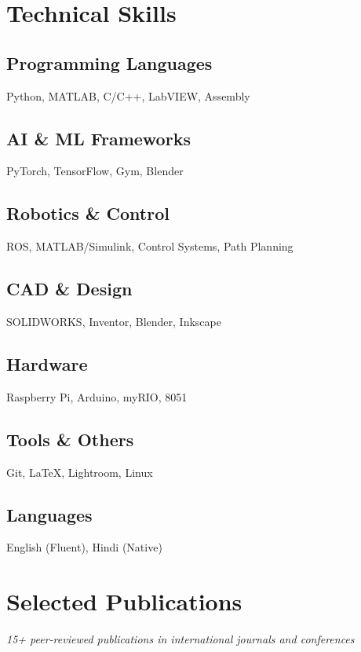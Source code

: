 \documentclass[11pt,a4paper]{article}
\begin{document}
\section*{Technical Skills}

\subsection*{Programming Languages}
Python, MATLAB, C/C++, LabVIEW, Assembly

\subsection*{AI \& ML Frameworks}
PyTorch, TensorFlow, Gym, Blender

\subsection*{Robotics \& Control}
ROS, MATLAB/Simulink, Control Systems, Path Planning

\subsection*{CAD \& Design}
SOLIDWORKS, Inventor, Blender, Inkscape

\subsection*{Hardware}
Raspberry Pi, Arduino, myRIO, 8051

\subsection*{Tools \& Others}
Git, \LaTeX, Lightroom, Linux

\subsection*{Languages}
English (Fluent), Hindi (Native)

\section*{Selected Publications}

\textit{15+ peer-reviewed publications in international journals and conferences}

\vspace{0.3cm}
\end{document}
